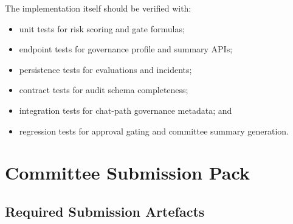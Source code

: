 \documentclass[11pt,a4paper]{article}
\begin{document}
The implementation itself should be verified with:

\begin{itemize}[nosep]
    \item unit tests for risk scoring and gate formulas;
    \item endpoint tests for governance profile and summary APIs;
    \item persistence tests for evaluations and incidents;
    \item contract tests for audit schema completeness;
    \item integration tests for chat-path governance metadata; and
    \item regression tests for approval gating and committee summary generation.
\end{itemize}

\section{Committee Submission Pack}

\subsection{Required Submission Artefacts}
\end{document}
